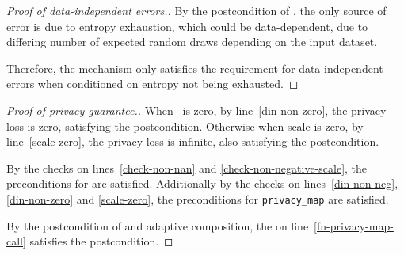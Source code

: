 \documentclass{article}
\begin{document}
\begin{proof}[Proof of data-independent errors.]
    By the postcondition of ,
    the only source of error is due to entropy exhaustion, which could be data-dependent,
    due to differing number of expected random draws depending on the input dataset.
    
    Therefore, the mechanism only satisfies the requirement for data-independent errors when conditioned on entropy not being exhausted.
\end{proof}

\begin{proof}[Proof of privacy guarantee.]
    When \din\ is zero, by line~\ref{din-non-zero}, the privacy loss is zero, satisfying the postcondition.
    Otherwise when scale is zero, by line~\ref{scale-zero}, the privacy loss is infinite, also satisfying the postcondition.

    By the checks on lines~\ref{check-non-nan} and \ref{check-non-negative-scale},
    the preconditions for  are satisfied.
    Additionally by the checks on lines~\ref{din-non-neg}, \ref{din-non-zero} and \ref{scale-zero},
    the preconditions for \texttt{privacy\_map} are satisfied.

    By the postcondition of  and adaptive composition,
    the \dout on line~\ref{fn-privacy-map-call} satisfies the postcondition.
\end{proof}
\end{document}
